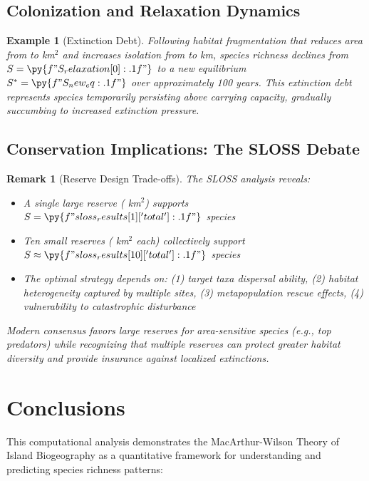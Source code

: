 \documentclass[a4paper, 11pt]{article}
\newtheorem{example}{Example}[section]
\newtheorem{remark}{Remark}[section]
\begin{document}
\subsection{Colonization and Relaxation Dynamics}

\begin{example}[Extinction Debt]
Following habitat fragmentation that reduces area from  to  km$^2$
and increases isolation from  to  km, species richness declines
from $S = \py{f"{S_relaxation[0]:.1f}"}$ to a new equilibrium $S^* = \py{f"{S_new_eq:.1f}"}$ over approximately
100 years. This extinction debt represents species temporarily persisting above carrying capacity, gradually
succumbing to increased extinction pressure.
\end{example}

\subsection{Conservation Implications: The SLOSS Debate}

\begin{remark}[Reserve Design Trade-offs]
The SLOSS analysis reveals:
\begin{itemize}
\item A single large reserve ( km$^2$) supports $S = \py{f"{sloss_results[1]['total']:.1f}"}$ species
\item Ten small reserves ( km$^2$ each) collectively support $S \approx \py{f"{sloss_results[10]['total']:.1f}"}$ species
\item The optimal strategy depends on: (1) target taxa dispersal ability, (2) habitat heterogeneity captured by multiple sites, (3) metapopulation rescue effects, (4) vulnerability to catastrophic disturbance
\end{itemize}
Modern consensus favors large reserves for area-sensitive species (e.g., top predators) while recognizing that
multiple reserves can protect greater habitat diversity and provide insurance against localized extinctions.
\end{remark}

\section{Conclusions}

This computational analysis demonstrates the MacArthur-Wilson Theory of Island Biogeography as a quantitative framework
for understanding and predicting species richness patterns:
\end{document}
